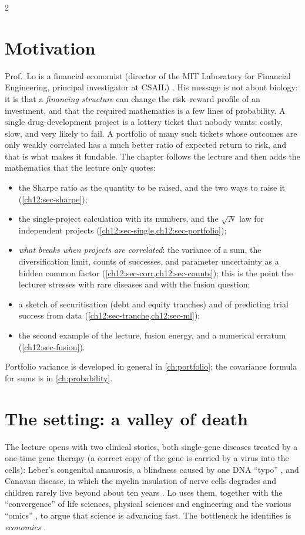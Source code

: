 \begin{paracol}{2}
\section*{Motivation}
Prof.\ Lo is a financial economist (director of the MIT Laboratory for Financial Engineering, principal investigator
at CSAIL) . His message is not about biology: it is that a \emph{financing structure} can change the
risk--reward profile of an investment, and that the required mathematics is a few lines of probability. A single
drug-development project is a lottery ticket that nobody wants: costly, slow, and very likely to fail. A
portfolio of many such tickets whose outcomes are only weakly correlated has a much better ratio of expected
return to risk, and that is what makes it fundable. The chapter follows the lecture and then adds the
mathematics that the lecture only quotes:
\begin{itemize}
  \item the Sharpe ratio as the quantity to be raised, and the two ways to raise it (\cref{ch12:sec-sharpe});
  \item the single-project calculation with its numbers, and the $\sqrt N$ law for independent projects
        (\cref{ch12:sec-single,ch12:sec-portfolio});
  \item \emph{what breaks when projects are correlated}: the variance of a sum, the diversification limit,
        counts of successes, and parameter uncertainty as a hidden common factor
        (\cref{ch12:sec-corr,ch12:sec-counts}); this is the point the lecturer stresses with rare diseases and
        with the fusion question;
  \item a sketch of securitisation (debt and equity tranches) and of predicting trial success from data
        (\cref{ch12:sec-tranche,ch12:sec-ml});
  \item the second example of the lecture, fusion energy, and a numerical erratum (\cref{ch12:sec-fusion}).
\end{itemize}
Portfolio variance is developed in general in \cref{ch:portfolio}; the covariance formula for sums is in
\cref{ch:probability}.

\section{The setting: a valley of death}\label{ch12:sec-setting}

The lecture opens with two clinical stories, both single-gene diseases treated by a one-time gene therapy
(a correct copy of the gene is carried by a virus into the cells): Leber's congenital amaurosis, a blindness
caused by one DNA ``typo'' , and Canavan disease, in which the myelin insulation of nerve
cells degrades and children rarely live beyond about ten years . Lo uses them, together with
the ``convergence'' of life sciences, physical sciences and engineering and the various ``omics''
, to argue that science is advancing fast. The bottleneck he identifies is \emph{economics}
.


\end{paracol}
